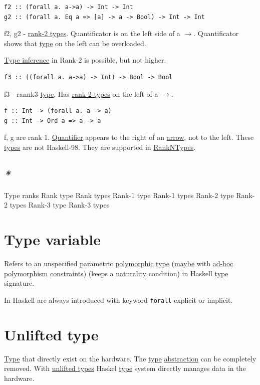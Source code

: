 \documentclass[a4paper,14pt,oneside]{book}
\begin{document}
\begin{verbatim}
f2 :: (forall a. a->a) -> Int -> Int
g2 :: (forall a. Eq a => [a] -> a -> Bool) -> Int -> Int
\end{verbatim}
f2, g2 - \hyperref[org3c6a64f]{rank-2 types}. Quantificator is on the left side of a \(\to\). Quantificator shows that \hyperref[org84bd6a1]{type} on the left can be overloaded.

\hyperref[org68f9198]{Type inference} in Rank-2 is possible, but not higher.

\begin{verbatim}
f3 :: ((forall a. a->a) -> Int) -> Bool -> Bool
\end{verbatim}
f3 - rannk3-\hyperref[org84bd6a1]{type}. Has \hyperref[org3c6a64f]{rank-2 types} on the left of a \(\to\).

\begin{verbatim}
f :: Int -> (forall a. a -> a)
g :: Int -> Ord a => a -> a
\end{verbatim}
f, g are rank 1. \hyperref[orgee67373]{Quantifier} appears to the right of an \hyperref[org4f12441]{arrow}, not to the left. These \hyperref[orgd1c0201]{types} are not Haskell-98. They are supported in \hyperref[org69bd184]{RankNTypes}.


\subsection{\emph{*}}
\label{sec:orgdec1fa8}

\label{org61a62f2}Type ranks
\label{orgbfb87af}Rank type
\label{org89bc547}Rank types
\label{org8a9f026}Rank-1 type
\label{org77de068}Rank-1 types
\label{org5caed8a}Rank-2 type
\label{org3c6a64f}Rank-2 types
\label{org0dc21e2}Rank-3 type
\label{orge4c3c49}Rank-3 types

\section{\label{org379ef1b}Type variable}
\label{sec:orgd34dcd5}
Refers to an unspecified parametric \hyperref[orgff18cd7]{polymorphic} \hyperref[org84bd6a1]{type} (\hyperref[orga5079a0]{maybe} with \hyperref[org0ce268b]{ad-hoc polymorphism} \hyperref[org3b9e7d2]{constraints}) (keeps a \hyperref[org806fc9a]{naturality} condition) in Haskell \hyperref[org84bd6a1]{type} signature.

In Haskell are always introduced with keyword \texttt{forall} explicit or implicit.

\section{\label{org64e6500}Unlifted type}
\label{sec:orgc532ed5}
\hyperref[org84bd6a1]{Type} that directly exist on the hardware. The \hyperref[org84bd6a1]{type} \hyperref[org9e1663c]{abstraction} can be completely removed.
With \hyperref[orgd60a9ac]{unlifted types} Haskel \hyperref[org84bd6a1]{type} system directly manages data in the hardware.
\end{document}
